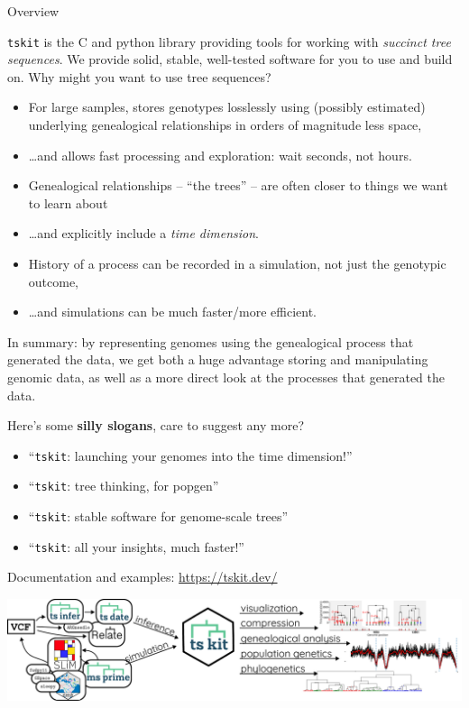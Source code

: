 \documentclass[landscape,a0paper,fontscale=0.5]{baposter}
\newcommand{\tskit}{{\texttt{tskit}}}
\newcommand{\compresslist}{%
 \setlength{\itemsep}{1pt}%
 \setlength{\parskip}{0pt}%
 \setlength{\parsep}{0pt}%
 }
\begin{document}
\begin{poster}
\begin{posterbox}[name=overview,column=1,row=0,span=2]{Overview}
\begin{multicols}{2}

\tskit{} is the C and python library providing tools for working with \emph{succinct tree sequences}.
We provide solid, stable, well-tested software for you to use and build on.
Why might you want to use tree sequences?
\begin{itemize} \compresslist
    \item For large samples,
        stores genotypes losslessly using (possibly estimated) underlying genealogical relationships
        in orders of magnitude less space,
    \item \ldots and allows fast processing and exploration: wait seconds, not hours.
    \item Genealogical relationships -- ``the trees'' -- are often closer to
        things we want to learn about
    \item \ldots and explicitly include a \emph{time dimension}.
    \item History of a process can be recorded in a simulation, not just the genotypic outcome,
    \item \ldots and simulations can be much faster/more efficient.
\end{itemize}

In summary:
by representing genomes using the genealogical process that generated the data,
we get both a huge advantage storing and manipulating genomic data,
as well as a more direct look at the processes that generated the data.

Here's some \textbf{silly slogans}, care to suggest any more?
\begin{itemize} \compresslist
    \item ``\tskit: launching your genomes into the time dimension!''
    \item ``\tskit: tree thinking, for popgen''
    \item ``\tskit: stable software for genome-scale trees''
    \item ``\tskit: all your insights, much faster!''
\end{itemize}

\end{multicols}

    \begin{center} \Large
        Documentation and examples: \url{https://tskit.dev/}
    \end{center}

\includegraphics[width=\textwidth]{workflow}



\end{posterbox}
\end{poster}
\end{document}
